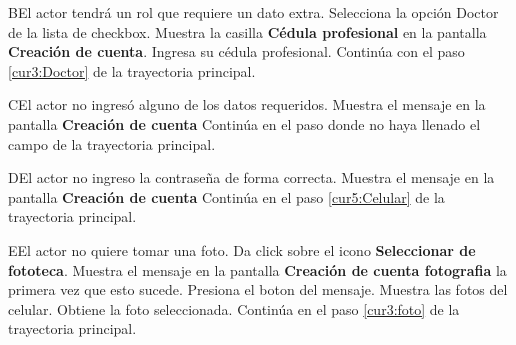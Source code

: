  \begin{UCtrayectoriaA}{B}{El actor tendrá un rol que requiere un dato extra.}
 	\UCpaso [\UCactor] Selecciona la opción Doctor de la lista de checkbox.
 	\UCpaso Muestra la casilla \textbf{Cédula profesional} en la pantalla \textbf{Creación de cuenta}.
 	\UCpaso [\UCactor] Ingresa su cédula profesional.
 	\UCpaso Continúa con el paso \ref{cur3:Doctor} de la trayectoria principal.
 	
   
 \end{UCtrayectoriaA}
 
\begin{UCtrayectoriaA}{C}{El actor no ingresó alguno de los datos requeridos.}
	\UCpaso[\UCsist] Muestra el mensaje  en la pantalla \textbf{Creación de cuenta}
	\UCpaso[] Continúa en el paso donde no haya llenado el campo de la trayectoria principal.
\end{UCtrayectoriaA}

\begin{UCtrayectoriaA}{D}{El actor no ingreso la contraseña de forma correcta.}
	\UCpaso[\UCsist] Muestra el mensaje  en la pantalla \textbf{Creación de cuenta}
	\UCpaso[] Continúa en el paso \ref{cur5:Celular} de la trayectoria principal.
\end{UCtrayectoriaA}

\begin{UCtrayectoriaA}{E}{El actor no quiere tomar una foto.}
	\UCpaso [\UCactor] Da click sobre el icono \textbf{Seleccionar de fototeca}.
	\UCpaso Muestra el mensaje  en la pantalla \textbf{Creación de cuenta fotografia} la primera vez que esto sucede.
	\UCpaso [\UCactor] Presiona el boton  del mensaje.
	\UCpaso Muestra las fotos del celular.
	\UCpaso Obtiene la foto seleccionada.
	\UCpaso Continúa en el paso \ref{cur3:foto} de la trayectoria principal.
	
\end{UCtrayectoriaA}
 

